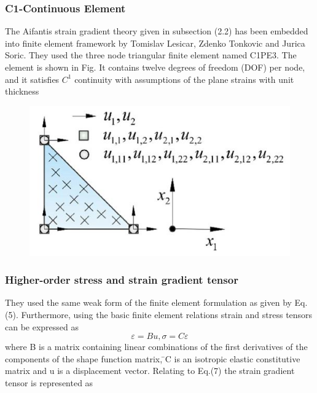 \documentclass[12pt]{article}
\begin{document}
\subsubsection{ C1-Continuous Element}
The Aifantis strain gradient theory given in subsection (2.2) has been embedded into finite element framework by Tomislav Lesicar, Zdenko Tonkovic and Jurica Soric. They used the three node triangular finite element named C1PE3. The element is shown in
Fig. It contains twelve degrees of freedom (DOF) per node, and it satisfies $C^1$ continuity with assumptions of the plane strains with unit thickness
\newline
     \begin{figure}[H]
     	\begin{center}
	      \includegraphics[scale=0.8]{Tri_Element.JPG}  
	    \end{center}  
     \end{figure}
\subsubsection{ Higher-order stress and strain gradient tensor} 
They used the same weak form of the finite element formulation as given by Eq.(5). Furthermore, using the basic finite element relations strain and stress tensors can be expressed as
\begin{equation}
\varepsilon = Bu,      \sigma=C\varepsilon
\end{equation}
\newline
where B is a matrix containing linear combinations of the first derivatives of the components of the shape function matrix, ̄C is an isotropic elastic constitutive matrix and u  is a displacement vector. Relating to Eq.(7) the strain gradient tensor is represented as
\end{document}
